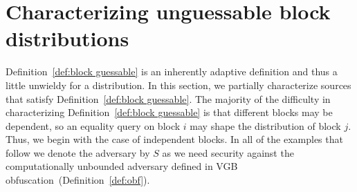 \documentclass[11pt]{article}
\newcommand{\defref}[1]{\mbox{Definition~\ref{#1}}}
\begin{document}
\section{Characterizing unguessable block distributions}
\label{sec:characterize}

\defref{def:block guessable} is an inherently adaptive definition and thus a little unwieldy for a distribution.  In this section, we partially characterize sources that satisfy \defref{def:block guessable}.
The majority of the difficulty in characterizing \defref{def:block guessable} is that different blocks may be dependent, so an equality query on block $i$ may shape the distribution of block $j$.  Thus, we begin with the case of independent blocks.  In all of the examples that follow we denote the adversary by $S$ as we need security against the computationally unbounded adversary defined in VGB obfuscation~(\defref{def:obf}).
\end{document}
